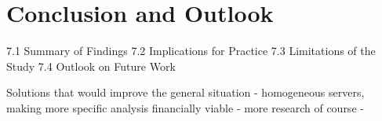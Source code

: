 \chapter{Conclusion and Outlook} %
\label{Chapter7}

    7.1 Summary of Findings
    7.2 Implications for Practice
    7.3 Limitations of the Study
    7.4 Outlook on Future Work


Solutions that would improve the general situation
- homogeneous servers, making more specific analysis financially viable
- more research of course
- 